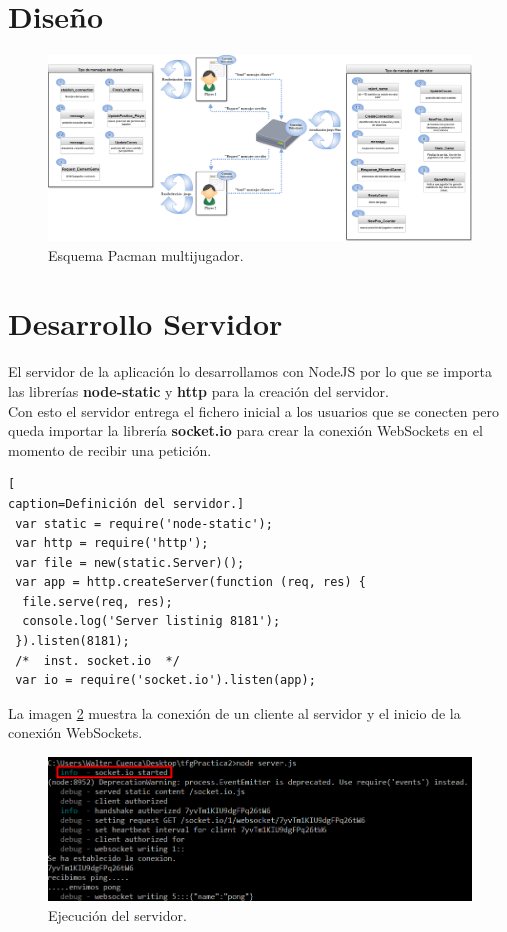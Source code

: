 \section{Diseño}
\begin{figure}[!h]
\begin{center}
  \includegraphics[width=0.9\linewidth]{Figures/Esquema_Pacman_Multijugador}
	\decoRule
	\caption[Esquema Pacman multijugador]{Esquema Pacman multijugador.}
\label{fig:Esquema_Pacman_Multijugador}
\end{center}
\end{figure}
\section{Desarrollo Servidor}
El servidor de la aplicación lo desarrollamos con NodeJS por lo que se importa las librerías \textbf{node-static} y \textbf{http} para la creación del servidor.
\\Con esto el servidor entrega el fichero inicial a los usuarios que se conecten pero queda importar la librería \textbf{socket.io} para crear la conexión WebSockets en el momento de recibir una petición.
\begin{lstlisting}[
caption=Definición del servidor.]
 var static = require('node-static');
 var http = require('http');
 var file = new(static.Server)();
 var app = http.createServer(function (req, res) {
  file.serve(req, res);
  console.log('Server listinig 8181');
 }).listen(8181);
 /*  inst. socket.io  */
 var io = require('socket.io').listen(app);
\end{lstlisting}
La imagen \ref{fig:EjecucionServer} muestra la conexión de un cliente al servidor y el inicio de la conexión WebSockets.
\begin{figure}[!h]
\begin{center}
  \includegraphics[width=0.7\linewidth]{Figures/Init_Server}
	\decoRule
	\caption[Ejecución del servidor]{Ejecución del servidor.}
\label{fig:EjecucionServer}
\end{center}
\end{figure}
